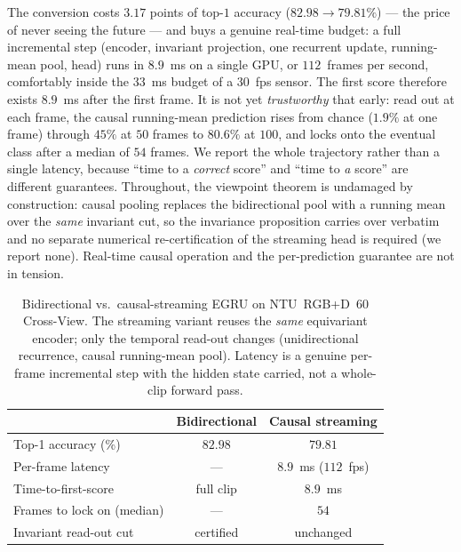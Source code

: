 \documentclass[10pt,journal]{IEEEtran}
\begin{document}
The conversion costs $3.17$ points of top-$1$ accuracy ($82.98\!\to\!79.81\%$) --- the price of
never seeing the future --- and buys a genuine real-time budget: a full incremental step (encoder,
invariant projection, one recurrent update, running-mean pool, head) runs in $8.9$~ms on a single
GPU, or $112$~frames per second, comfortably inside the $33$~ms budget of a $30$~fps sensor. The
first score therefore exists $8.9$~ms after the first frame. It is not yet \emph{trustworthy} that
early: read out at each frame, the causal running-mean prediction rises from chance ($1.9\%$ at one
frame) through $45\%$ at $50$ frames to $80.6\%$ at $100$, and locks onto the eventual class after a
median of $54$ frames. We report the whole trajectory rather than a single latency, because ``time
to a \emph{correct} score'' and ``time to \emph{a} score'' are different guarantees. Throughout, the
viewpoint theorem is undamaged by construction: causal pooling replaces the bidirectional pool with a
running mean over the \emph{same} invariant cut, so the invariance proposition carries over verbatim
and no separate numerical re-certification of the streaming head is required (we report none).
Real-time causal operation and the per-prediction guarantee are not
in tension.

\begin{table}[!t]
\centering
\caption{Bidirectional vs.\ causal-streaming EGRU on NTU~RGB+D~$60$ Cross-View. The streaming variant
reuses the \emph{same} equivariant encoder; only the temporal read-out changes (unidirectional
recurrence, causal running-mean pool). Latency is a genuine per-frame incremental step with the
hidden state carried, not a whole-clip forward pass.}
\label{tab:streaming}
\scriptsize
\setlength{\tabcolsep}{5pt}
\begin{tabular}{lcc}
\toprule
 & Bidirectional & Causal streaming \\
\midrule
Top-1 accuracy (\%)             & $82.98$        & $79.81$ \\
Per-frame latency               & ---            & $8.9$~ms ($112$~fps) \\
Time-to-first-score             & full clip      & $8.9$~ms \\
Frames to lock on (median)      & ---            & $54$ \\
Invariant read-out cut          & certified      & unchanged \\
\bottomrule
\end{tabular}
\end{table}
\end{document}

